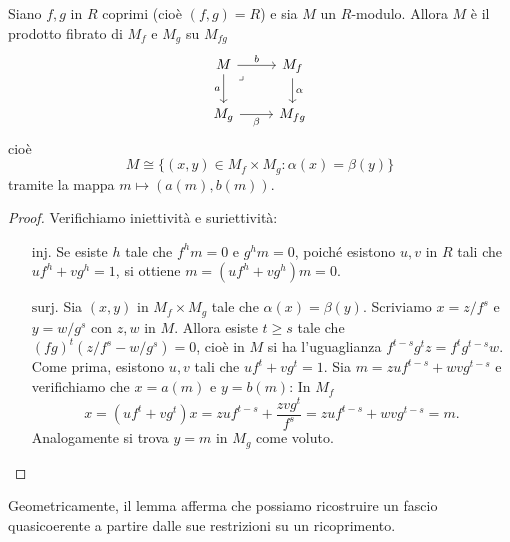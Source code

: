 \begin{lemma}\label{LmFasciQuasicoerentiSonoIncollamentoDiRestrizioniSuRicoprimento}
Siano $f,g$ in $R$ coprimi (cioè $(f,g)=R$) e sia $M$ un $R$-modulo. Allora $M$ \`e il prodotto fibrato di $M_f$ e $M_g$ su $M_{fg}$
\[\begin{tikzcd}
	M & {M_f} \\
	{M_g} & {M_{fg}}
	\arrow["b", from=1-1, to=1-2]
	\arrow["a"', from=1-1, to=2-1]
	\arrow["\lrcorner"{anchor=center, pos=0.125}, draw=none, from=1-1, to=2-2]
	\arrow["\alpha", from=1-2, to=2-2]
	\arrow["\beta"', from=2-1, to=2-2]
\end{tikzcd}\]
cio\`e
\[M\cong \{(x,y)\in M_f\times M_g \colon \alpha(x)=\beta(y) \}\] 
tramite la mappa $m\mapsto (a(m),b(m))$. 
\end{lemma}
\begin{proof}
Verifichiamo iniettivit\`a e suriettivit\`a:
\setlength{\leftmargini}{0cm}
\begin{itemize}
\item[$\boxed{\text{inj.}}$] Se esiste $h$ tale che $f^hm=0$ e $g^hm=0$, poiché esistono $u,v$ in $R$ tali che $uf^h+vg^h=1$, si ottiene $m=(uf^h+vg^h)m=0$.
\item[$\boxed{\text{surj.}}$] Sia $(x,y)$ in $M_f\times M_g$ tale che $\alpha(x)=\beta(y)$. Scriviamo $x=z/f^s$ e $y=w/g^s$ con $z,w$ in $M$. Allora esiste $t\ge s$ tale che $(fg)^t (z/f^s-w/g^s)=0$, cioè in $M$ si ha l'uguaglianza $f^{t-s}g^t z= f^tg^{t-s}w$. Come prima, esistono $u,v$ tali che $uf^t+vg^t=1$. Sia $m=zu f^{t-s}+wvg^{t-s}$ e verifichiamo che $x=a(m)$ e $y=b(m)$:
In $M_f$ 
\[x=(uf^t+vg^t)x=zuf^{t-s}+\frac{zvg^{t}}{f^s}=zu f^{t-s}+wvg^{t-s}=m.\]  
Analogamente si trova $y=m$ in $M_g$ come voluto.
\end{itemize}
\setlength{\leftmargini}{0.5cm}
\end{proof}
\begin{remark}
Geometricamente, il lemma afferma che possiamo ricostruire un fascio quasicoerente a partire dalle sue restrizioni su un ricoprimento.
\end{remark}

